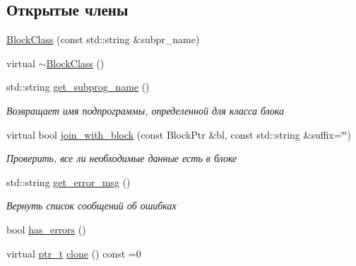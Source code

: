 \subsection*{Открытые члены}
\begin{DoxyCompactItemize}
\item 
\hyperlink{classLIBKMS__namespace_1_1BlockClass_a7992caf06a72d7f17240e5e24eab61c2}{Block\-Class} (const std\-::string \&subpr\-\_\-name)
\item 
virtual \hyperlink{classLIBKMS__namespace_1_1BlockClass_a1d886c2451ceb0ebc568ca194248f82f}{$\sim$\-Block\-Class} ()
\item 
std\-::string \hyperlink{classLIBKMS__namespace_1_1BlockClass_a782a534ee4e5b4b6a4c49ef2e1094c9b}{get\-\_\-subprog\-\_\-name} ()
\begin{DoxyCompactList}\small\item\em Возвращает имя подпрограммы, определенной для класса блока \end{DoxyCompactList}\item 
virtual bool \hyperlink{classLIBKMS__namespace_1_1BlockClass_a80b37764d473f2072c44a2fcde530b0d}{join\-\_\-with\-\_\-block} (const Block\-Ptr \&bl, const std\-::string \&suffix=\char`\"{}\char`\"{})
\begin{DoxyCompactList}\small\item\em Проверить, все ли необходимые данные есть в блоке \end{DoxyCompactList}\item 
std\-::string \hyperlink{classLIBKMS__namespace_1_1BlockClass_ae0ec4d88f144059e65872b189bda5be5}{get\-\_\-error\-\_\-msg} ()
\begin{DoxyCompactList}\small\item\em Вернуть список сообщений об ошибках \end{DoxyCompactList}\item 
bool \hyperlink{classLIBKMS__namespace_1_1BlockClass_a3be106b0c2ea94a56a621823280e7c3c}{has\-\_\-errors} ()
\item 
virtual \hyperlink{classLIBKMS__namespace_1_1BlockClass_a37593e298865c9e7050501f7ef176c91}{ptr\-\_\-t} \hyperlink{classLIBKMS__namespace_1_1BlockClass_a85199e54635541f20d262fa915140e53}{clone} () const =0
\end{DoxyCompactItemize}
